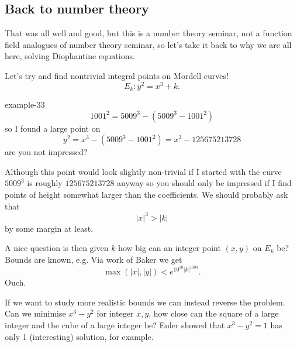 \documentclass[10pt,]{book}
\numberwithin{equation}{section}
\newcommand{\lt}{<}
\newcommand{\gt}{>}
\begin{document}
%
%
\typeout{************************************************}
\typeout{************************************************}
%
\subsection[{Back to number theory}]{Back to number theory}\label{subsection-62}
\hypertarget{p-705}{}%
That was all well and good, but this is a number theory seminar, not a function field analogues of number theory seminar, so let's take it back to why we are all here, solving Diophantine equations.%
\par
\hypertarget{p-706}{}%
Let's try and find nontrivial integral points on Mordell curves!%
\begin{equation*}
E_k\colon y^2 = x^3 + k\text{.}
\end{equation*}
%
\begin{example}{}{example-33}%
\hypertarget{p-707}{}%
%
\begin{equation*}
1001^2 = 5009^3 - (5009^3 - 1001^2)
\end{equation*}
so I found a large point on%
\begin{equation*}
y^2 = x^3 - (5009^3 - 1001^2) = x^3 - 125675213728
\end{equation*}
are you not impressed?%
\end{example}
\hypertarget{p-708}{}%
Although this point would look slightly non-trivial if I started with the curve \(5009^3\) is roughly \(125675213728\) anyway so you should only be impressed if I find points of height somewhat larger than the coefficients. We should probably ask that%
\begin{equation*}
|x|^3 \gt |k|
\end{equation*}
by some margin at least.%
\par
\hypertarget{p-709}{}%
A nice question is then given \(k\) how big can an integer point \((x,y)\) on \(E_k\) be? Bounds are known, e.g.  Via work of Baker we get%
\begin{equation*}
\max(|x|, |y|) \lt e^{10^{10}|k|^{1000}}\text{.}
\end{equation*}
Ouch.%
\par
\hypertarget{p-710}{}%
If we want to study more realistic bounds we can instead reverse the problem. Can we minimise \(x^3 - y^2\) for integer \(x,y\), how close can the square of a large integer and the cube of a large integer be? Euler showed that \(x^3 - y^2 = 1\) has only 1 (interesting) solution, for example.%
\end{document}
